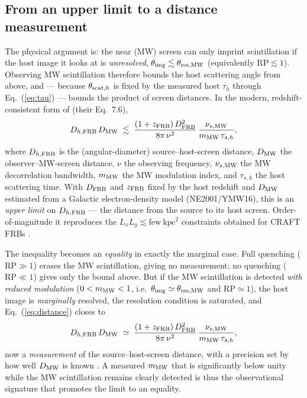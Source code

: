 \subsection{From an upper limit to a distance measurement}
\label{sec:distance}

The physical argument \citep{Masui2015,CordesChatterjee2019} is: the near
(MW) screen can only imprint scintillation if the host image it looks at is
\emph{unresolved}, $\theta_{\rm img}\lesssim\theta_{\rm res,MW}$
(equivalently $\mathrm{RP}\lesssim1$). Observing MW scintillation therefore
bounds the host scattering angle from above, and — because
$\theta_{{\rm scat},h}$ is fixed by the measured host $\tau_{h}$ through
Eq.~(\ref{eq:tau}) — bounds the product of screen distances. In the modern,
redshift-consistent form of \citet{Pradeep2025} (their Eq.~7.6),
%
\begin{equation}
D_{h,\rm FRB}\,D_{\rm MW}
  \;\lesssim\;
  \frac{(1+z_{\rm FRB})\,D_{\rm FRB}^{2}}{8\pi\,\nu^{2}}\,
  \frac{\nu_{s,\rm MW}}{m_{\rm MW}\,\tau_{s,h}},
\label{eq:distance}
\end{equation}
%
where $D_{h,\rm FRB}$ is the (angular-diameter) source--host-screen
distance, $D_{\rm MW}$ the observer--MW-screen distance, $\nu$ the observing
frequency, $\nu_{s,\rm MW}$ the MW decorrelation bandwidth, $m_{\rm MW}$ the
MW modulation index, and $\tau_{s,h}$ the host scattering time. With
$D_{\rm FRB}$ and $z_{\rm FRB}$ fixed by the host redshift and $D_{\rm MW}$
estimated from a Galactic electron-density model (NE2001/YMW16), this is an
\emph{upper limit} on $D_{h,\rm FRB}$ — the distance from the source to its
host screen. Order-of-magnitude it reproduces the
$L_{x}L_{g}\lesssim\text{few}\ \mathrm{kpc}^{2}$ constraints obtained for
CRAFT FRBs \citep{Sammons2023}.

The inequality becomes an \emph{equality} in exactly the marginal case.
Full quenching ($\mathrm{RP}\gg1$) erases the MW scintillation, giving no
measurement; no quenching ($\mathrm{RP}\ll1$) gives only the bound above.
But if the MW scintillation is detected \emph{with reduced modulation}
($0<m_{\rm MW}<1$, i.e.\ $\theta_{\rm img}\simeq\theta_{\rm res,MW}$ and
$\mathrm{RP}\simeq1$), the host image is \emph{marginally} resolved, the
resolution condition is saturated, and Eq.~(\ref{eq:distance}) closes to
%
\begin{equation}
D_{h,\rm FRB}\,D_{\rm MW}
  \;\simeq\;
  \frac{(1+z_{\rm FRB})\,D_{\rm FRB}^{2}}{8\pi\,\nu^{2}}\,
  \frac{\nu_{s,\rm MW}}{m_{\rm MW}\,\tau_{s,h}},
\label{eq:distance_eq}
\end{equation}
%
now a \emph{measurement} of the source--host-screen distance, with a
precision set by how well $D_{\rm MW}$ is known
\citep[cf.][their locating-the-host-screen result]{Pradeep2025}. A measured
$m_{\rm MW}$ that is significantly below unity while the MW scintillation
remains clearly detected is thus the observational signature that promotes
the limit to an equality.

